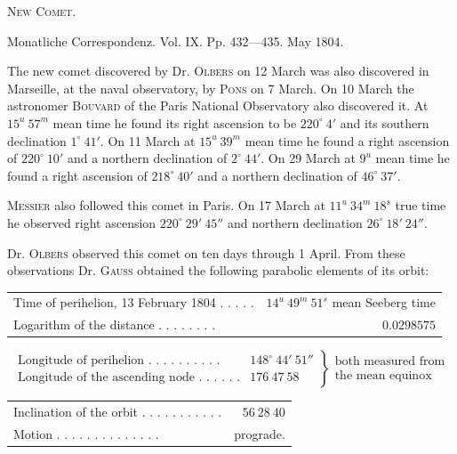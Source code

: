 \centerline{\textsc{New Comet.}}

\medskip
Monatliche Correspondenz. Vol. IX. Pp. 432---435. May 1804.

\medskip
The new comet discovered by Dr. \textsc{Olbers} on 12 March was also discovered in Marseille, at the naval observatory, by \textsc{Pons} on 7 March. On 10 March the astronomer \textsc{Bouvard} of the Paris National Observatory also discovered it. At $15^u\ 57^m$ mean time he found its right ascension to be $220^\circ\ 4'$ and its southern declination $1^\circ\ 41'$. On 11 March at $15^u\ 39^m$ mean time he found a right ascension of $220^\circ\ 10'$ and a northern declination of $2^\circ\ 44'$. On 29 March at $9^u$ mean time he found a right ascension of $218^\circ\ 40'$ and a northern declination of $46^\circ\ 37'$.

\textsc{Messier} also followed this comet in Paris. On 17 March at $11^u\ 34^m\ 18^s$ true time he observed right ascension $220^\circ\ 29'\ 45''$ and northern declination $26^\circ\ 18'\ 24''$.

Dr. \textsc{Olbers} observed this comet on ten days through 1 April. From these observations Dr. \textsc{Gauss} obtained the following parabolic elements of its orbit:

\begin{center}
\begingroup\fontsize{9}{11}\selectfont\setlength{\tabcolsep}{3pt}
\begin{tabular}{lr}
Time of perihelion, 13 February 1804 . . . . . & $14^u\ 49^m\ 51^s$ mean Seeberg time \\
Logarithm of the distance . . . . . . . . & $0.0298575$ \\
\end{tabular}\endgroup
\end{center}
{\fontsize{8}{10}\selectfont
\[\left.\begin{array}{ll}\text{Longitude of perihelion . . . . . . . . . .}&148^\circ\ 44'\ 51''\\\text{Longitude of the ascending node . . . . . .}&176\ 47\ 58\end{array}\right\}\begin{array}{l}\text{both measured from}\\\text{the mean equinox}\end{array}\]}
\begin{center}
\begingroup\fontsize{9}{11}\selectfont\setlength{\tabcolsep}{3pt}
\begin{tabular}{lr}
Inclination of the orbit . . . . . . . . . . . & $56\ 28\ 40$ \\
Motion . . . . . . . . . . . . . . & prograde. \\
\end{tabular}\endgroup
\end{center}

